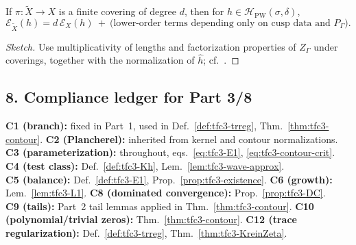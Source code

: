 \begin{proposition}\relax\hspace{0pt}
\label{prop:tfc3-cover} %
If $\pi:\widetilde{X}\to X$ is a finite covering of degree $d$, then for $h\in\mathcal{H}_{\mathrm{PW}}(\sigma,\delta)$,
\[
\mathcal{E}_{\widetilde{X}}(h)=d\,\mathcal{E}_X(h)\ +\ \text{(lower-order terms depending only on cusp data and }P_\Gamma).
\]
\end{proposition}

\begin{proof}[Sketch]\relax\hspace{0pt}
Use multiplicativity of lengths and factorization properties of $Z_\Gamma$ under coverings, together with the normalization of $\widehat{h}$; cf.\ \cite{HejhalII}.\relax\hspace{0pt}
\end{proof}

\subsection*{8. Compliance ledger for Part 3/8}\relax\hspace{0pt}
\label{subsec:tfc3-compliance} %

\noindent
\textbf{C1 (branch):} fixed in Part~1, used in Def.~\ref{def:tfc3-trreg}, Thm.~\ref{thm:tfc3-contour}. \quad
\textbf{C2 (Plancherel):} inherited from kernel and contour normalizations. \\
\textbf{C3 (parameterization):} throughout, eqs.~\eqref{eq:tfc3-E1}, \eqref{eq:tfc3-contour-crit}. \quad
\textbf{C4 (test class):} Def.~\ref{def:tfc3-Kh}, Lem.~\ref{lem:tfc3-wave-approx}. \\
\textbf{C5 (balance):} Def.~\ref{def:tfc3-E1}, Prop.~\ref{prop:tfc3-existence}. \quad
\textbf{C6 (growth):} Lem.~\ref{lem:tfc3-L1}. \quad
\textbf{C8 (dominated convergence):} Prop.~\ref{prop:tfc3-DC}. \\
\textbf{C9 (tails):} Part~2 tail lemmas applied in Thm.~\ref{thm:tfc3-contour}. \quad
\textbf{C10 (polynomial/trivial zeros):} Thm.~\ref{thm:tfc3-contour}. \quad
\textbf{C12 (trace regularization):} Def.~\ref{def:tfc3-trreg}, Thm.~\ref{thm:tfc3-KreinZeta}.\relax\hspace{0pt}

